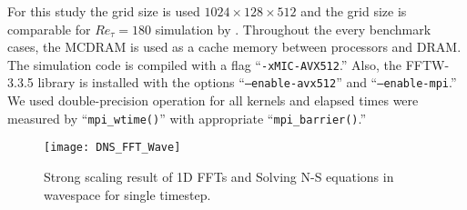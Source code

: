 For this study the grid size is used $1024\times128\times512$ and the grid size is comparable for $Re_\tau = 180$ simulation by \cite{Kim:1987ub}. Throughout the every benchmark cases, the MCDRAM is used as a cache memory between processors and DRAM. The simulation code is compiled with a flag ``{\tt -xMIC-AVX512}.'' Also, the FFTW-3.3.5 library is installed with the options ``{\tt --enable-avx512}'' and ``{\tt --enable-mpi}.'' \cite{Frigo:2005tu} We used double-precision operation for all kernels and elapsed times were measured by ``{\tt mpi\_wtime()}'' with appropriate ``{\tt mpi\_barrier()}.''

\begin{figure}[htb]
 \begin{center}
   \texttt{[image: DNS\_FFT\_Wave]}
   \caption{Strong scaling result of 1D FFTs and Solving N-S equations in wavespace for single timestep.}
   \label{fig:DNS_strong_scale_fft_wave}
 \end{center}
\end{figure}

